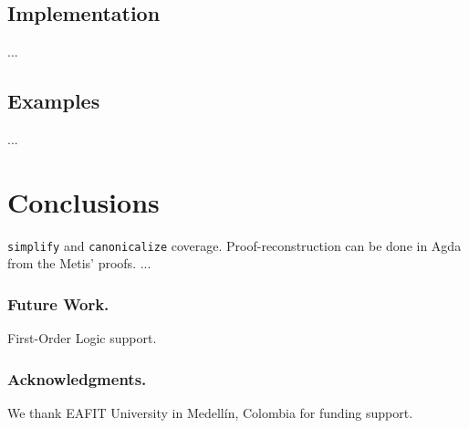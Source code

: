 \documentclass[runningheads,a4paper]{llncs}
\begin{document}
%



\subsection{Implementation}
...
\subsection{Examples}
...


\section{Conclusions}
\label{secconclusion}
\verb!simplify! and \verb!canonicalize! coverage.
Proof-reconstruction can be done in Agda from the Metis' proofs.
...

\subsubsection*{Future Work.}
First-Order Logic support.

\subsubsection*{Acknowledgments.}
We thank EAFIT University in Medell\'in, Colombia for funding support.



\end{document}
